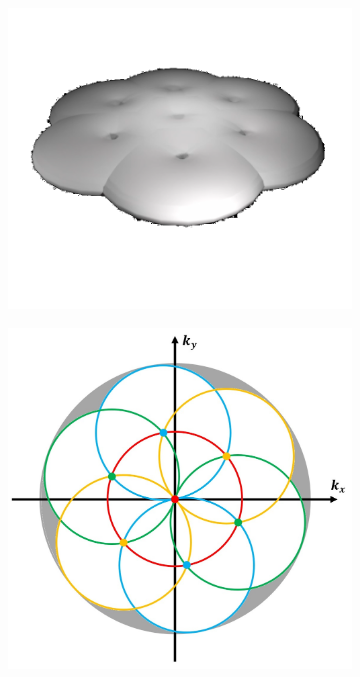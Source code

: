 \begin{figure}[h]
	\begin{subfigure}[t]{0.4\textwidth}
		\centering
		\includegraphics[width=\linewidth]{images/2D_SIM_OTF_all_2D_angles.png}
		\caption{}
		\label{fig:2D_SIM_OTF_all_2D_angles}
	\end{subfigure}
	\begin{subfigure}[t]{0.5\textwidth}
		\centering
		\includegraphics[width=\linewidth]{images/3D_SIM_OTF_xy_expansion_w_double_rad_filled.jpg}

\end{subfigure}
\end{figure}
